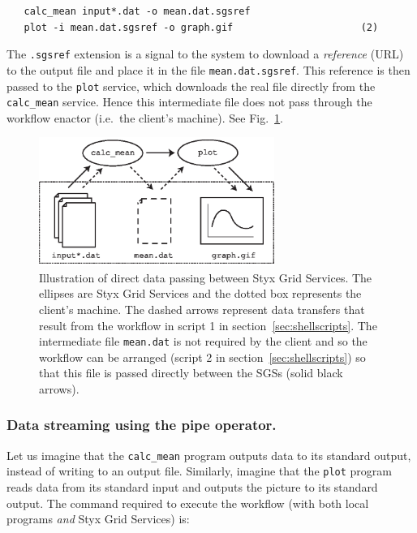 \documentclass{article}
\begin{document}
\begin{verbatim}
   calc_mean input*.dat -o mean.dat.sgsref
   plot -i mean.dat.sgsref -o graph.gif                      (2)
\end{verbatim}

The {\tt .sgsref} extension is a signal to the system to download a {\em reference\/} (URL) to the output file and place it in the file {\tt mean.dat.sgsref}.  This reference is then passed to the {\tt plot} service, which downloads the real file directly from the {\tt calc\_mean} service.  Hence this intermediate file does not pass through the workflow enactor (i.e.\ the client's machine).  See Fig.~\ref{fig:datapassing}.

\begin{figure}
\begin{center}
\includegraphics[height=4.2cm]{datapassing.eps}
\end{center}
\caption{Illustration of direct data passing between Styx Grid Services.  The ellipses are Styx Grid Services and the dotted box represents the client's machine.  The dashed arrows represent data transfers that result from the workflow in script 1 in section~\ref{sec:shellscripts}.  The intermediate file {\tt mean.dat} is not required by the client and so the workflow can be arranged (script 2 in section~\ref{sec:shellscripts}) so that this file is passed directly between the SGSs (solid black arrows).}\label{fig:datapassing}
\end{figure}


\subsubsection{Data streaming using the pipe operator.}\label{sec:pipes}
Let us imagine that the {\tt calc\_mean} program outputs data to its standard output, instead of writing to an output file.  Similarly, imagine that the {\tt plot} program reads data from its standard input and outputs the picture to its standard output.  The command required to execute the workflow (with both local programs {\em and\/} Styx Grid Services) is:
\end{document}
